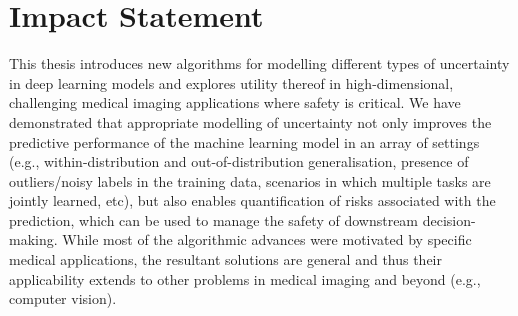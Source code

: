 \documentclass[12pt,a4paper,twoside]{book}
\begin{document}
%

\chapter*{Impact Statement}
This thesis introduces new algorithms for modelling different types of uncertainty in deep learning models and explores utility thereof in high-dimensional, challenging medical imaging applications where safety is critical. We have demonstrated that appropriate modelling of uncertainty not only improves the predictive performance of the machine learning model in an array of settings (e.g., within-distribution and out-of-distribution generalisation, presence of outliers/noisy labels in the training data, scenarios in which multiple tasks are jointly learned, etc), but also enables quantification of risks associated with the prediction, which can be used to manage the safety of downstream decision-making.  While most of the algorithmic advances were motivated by specific medical applications, the resultant solutions are general and thus their applicability extends to other problems in medical imaging and beyond (e.g., computer vision). 
\end{document}
